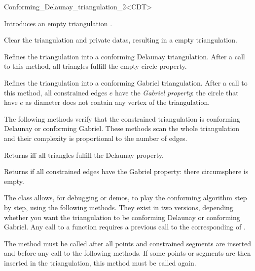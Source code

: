 \begin{ccRefClass}{Conforming_Delaunay_triangulation_2<CDT>}
\ccTypes 
{}

\ccCreation
{}

{Introduces an empty triangulation \ccVar.}

\ccOperations

{ Clear the triangulation and private datas, resulting in a empty
  triangulation. }


{ Refines the triangulation into a conforming Delaunay triangulation.
  After a call to this method, all triangles fulfill the empty circle
  property. }

{ Refines the triangulation into a conforming Gabriel triangulation.
  After a call to this method, all constrained edges $e$ have the
  \emph{Gabriel property}: the circle that have $e$ as diameter
  does not contain any vertex of the triangulation. }

The following methods verify that the constrained triangulation is
conforming Delaunay or conforming Gabriel. These methods scan the
whole triangulation and their complexity is proportional to the number
of edges.

{ Returns  iff all triangles fulfill the Delaunay property.}

{ Returns  if all constrained edges have the Gabriel property:
  there circumsphere is empty. }

\begin{ccAdvanced}


The \ccRefName{} class allows, for debugging or demos, to play the
conforming algorithm step by step, using the following methods. They
exist in two versions, depending whether you want the triangulation to
be conforming Delaunay or conforming Gabriel. Any call to a
 function requires a previous call to
the corresponding of .

{ The method must be called after all points and constrained segments
  are inserted and before any call to the following methods. If some
  points or segments are then inserted in the triangulation, this
  method must be called again. }


\end{ccAdvanced}
\end{ccRefClass}
